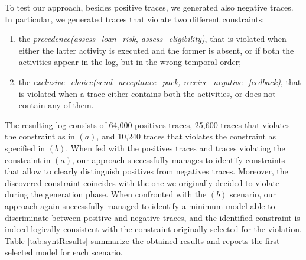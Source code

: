 To test our approach, besides positive traces, we generated also negative traces. In particular, we generated traces that violate two different constraints:
\begin{enumerate}[label=(\alph*)]
\item the \emph{precedence(assess\_loan\_risk, assess\_eligibility)}, that is violated when either the latter activity is executed and the former is absent, or if both the activities appear in the log, but in the wrong temporal order;
%
\item the \emph{exclusive\_choice(send\_acceptance\_pack, receive\_negative\_feedback)}, that is violated when a trace either contains both the activities, or does not contain any of them.
\end{enumerate}
%
The resulting log consists of 64,000 positives traces, 25,600 traces that violates the constraint as in $(a)$, and 10,240 traces that violates the constraint as specified in $(b)$.
%
When fed with the positives traces and traces violating the constraint in $(a)$, our approach successfully manages to identify constraints that allow to clearly distinguish positives from negatives traces. Moreover, the discovered constraint coincides with the one we originally decided to violate during the generation phase. When confronted with the $(b)$ scenario, our approach again successfully managed to identify a minimum model able to discriminate between positive and negative traces, and the identified constraint is indeed logically consistent with the constraint originally selected for the violation.
Table \ref{tab:syntResults} summarize the obtained results and reports the first selected model for each scenario.

